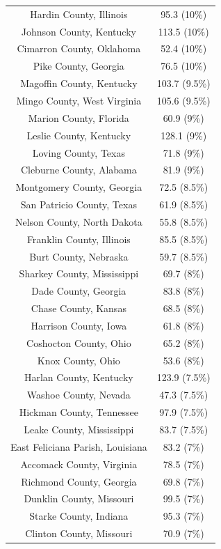 \begin{table}[ht]
\begin{tabular}{cc}
  Hardin County, Illinois & 95.3 (10\%) \\ 
  Johnson County, Kentucky & 113.5 (10\%) \\ 
  Cimarron County, Oklahoma & 52.4 (10\%) \\ 
  Pike County, Georgia & 76.5 (10\%) \\ 
  Magoffin County, Kentucky & 103.7 (9.5\%) \\ 
  Mingo County, West Virginia & 105.6 (9.5\%) \\ 
  Marion County, Florida & 60.9 (9\%) \\ 
  Leslie County, Kentucky & 128.1 (9\%) \\ 
  Loving County, Texas & 71.8 (9\%) \\ 
  Cleburne County, Alabama & 81.9 (9\%) \\ 
  Montgomery County, Georgia & 72.5 (8.5\%) \\ 
  San Patricio County, Texas & 61.9 (8.5\%) \\ 
  Nelson County, North Dakota & 55.8 (8.5\%) \\ 
  Franklin County, Illinois & 85.5 (8.5\%) \\ 
  Burt County, Nebraska & 59.7 (8.5\%) \\ 
  Sharkey County, Mississippi & 69.7 (8\%) \\ 
  Dade County, Georgia & 83.8 (8\%) \\ 
  Chase County, Kansas & 68.5 (8\%) \\ 
  Harrison County, Iowa & 61.8 (8\%) \\ 
  Coshocton County, Ohio & 65.2 (8\%) \\ 
  Knox County, Ohio & 53.6 (8\%) \\ 
  Harlan County, Kentucky & 123.9 (7.5\%) \\ 
  Washoe County, Nevada & 47.3 (7.5\%) \\ 
  Hickman County, Tennessee & 97.9 (7.5\%) \\ 
  Leake County, Mississippi & 83.7 (7.5\%) \\ 
  East Feliciana Parish, Louisiana & 83.2 (7\%) \\ 
  Accomack County, Virginia & 78.5 (7\%) \\ 
  Richmond County, Georgia & 69.8 (7\%) \\ 
  Dunklin County, Missouri & 99.5 (7\%) \\ 
  Starke County, Indiana & 95.3 (7\%) \\ 
  Clinton County, Missouri & 70.9 (7\%) \\ 

\end{tabular}
\end{table}
